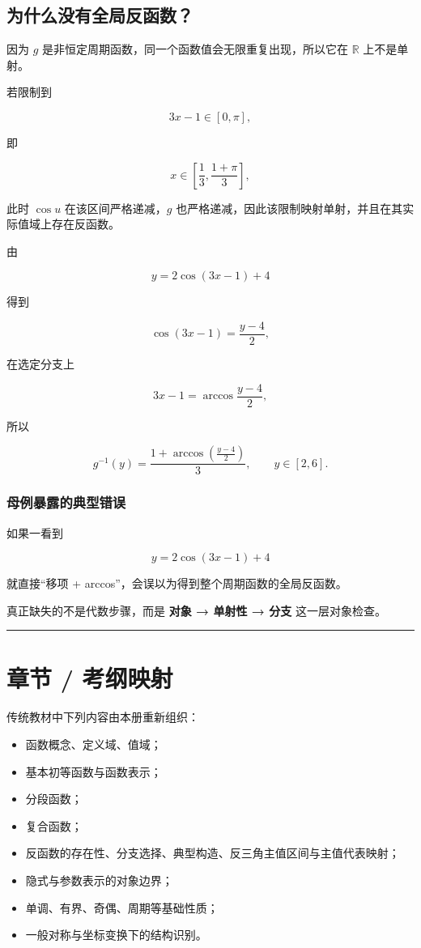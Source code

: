 \documentclass[11pt,a4paper]{ctexart}
\providecommand{\tightlist}{}
\begin{document}
\subsection{为什么没有全局反函数？}\label{ux4e3aux4ec0ux4e48ux6ca1ux6709ux5168ux5c40ux53cdux51fdux6570}

因为 \(g\) 是非恒定周期函数，同一个函数值会无限重复出现，所以它在
\(\mathbb R\) 上不是单射。

若限制到

\[
3x-1\in[0,\pi],
\]

即

\[
x\in\left[\frac13,\frac{1+\pi}{3}\right],
\]

此时 \(\cos u\) 在该区间严格递减，\(g\) 也严格递减，因此该限制映射单射，并且在其实际值域上存在反函数。

由

\[
y=2\cos(3x-1)+4
\]

得到

\[
\cos(3x-1)=\frac{y-4}{2},
\]

在选定分支上

\[
3x-1=\arccos\frac{y-4}{2},
\]

所以

\[
\boxed{
g^{-1}(y)=
\frac{1+\arccos\left(\frac{y-4}{2}\right)}{3}
},
\qquad y\in[2,6].
\]

\subsubsection{母例暴露的典型错误}\label{ux6bcdux4f8bux66b4ux9732ux7684ux5178ux578bux9519ux8bef}

如果一看到

\[
y=2\cos(3x-1)+4
\]

就直接``移项 + arccos''，会误以为得到整个周期函数的全局反函数。

真正缺失的不是代数步骤，而是 \textbf{对象 → 单射性 → 分支}
这一层对象检查。

\begin{center}\rule{0.5\linewidth}{0.5pt}\end{center}

\section{章节 / 考纲映射}\label{ux7ae0ux8282-ux8003ux7eb2ux6620ux5c04}

传统教材中下列内容由本册重新组织：

\begin{itemize}
\tightlist
\item
  函数概念、定义域、值域；
\item
  基本初等函数与函数表示；
\item
  分段函数；
\item
  复合函数；
\item
  反函数的存在性、分支选择、典型构造、反三角主值区间与主值代表映射；
\item
  隐式与参数表示的对象边界；
\item
  单调、有界、奇偶、周期等基础性质；
\item
  一般对称与坐标变换下的结构识别。
\end{itemize}
\end{document}
